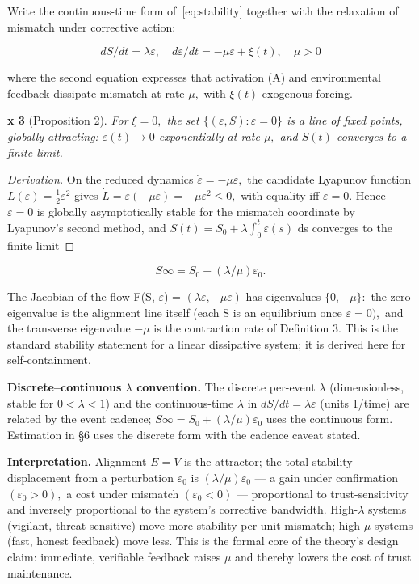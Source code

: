 \documentclass[
]{article}
\begin{document}
Write the continuous-time form of~{[}eq:stability{]} together with the
relaxation of mismatch under corrective action:

\begin{equation}
dS/dt = \lambda \varepsilon, \quad d\varepsilon/dt = -\mu \varepsilon + \xi(t), \quad \mu > 0
\label{eq:flow}
\end{equation}

where the second equation expresses that activation (A) and
environmental feedback dissipate mismatch at rate \(\mu,\) with
\(\xi(t)\) exogenous forcing.

\textbf{x 3} (Proposition 2). \emph{For \(\xi = 0,\) the set
\(\{(\varepsilon, S) : \varepsilon = 0\}\) is a line of fixed points,
globally attracting: \(\varepsilon(t) \to 0\) exponentially at rate
\(\mu,\) and \(S(t)\) converges to a finite limit.}

\emph{Derivation.} On the reduced dynamics
\(\dot{\varepsilon} = -\mu \varepsilon,\) the candidate Lyapunov
function \(L(\varepsilon) = \tfrac{1}{2} \varepsilon^{2}\) gives
\(\dot{L} = \varepsilon(-\mu \varepsilon) = -\mu \varepsilon^{2} \leq 0,\)
with equality iff \(\varepsilon = 0.\) Hence \(\varepsilon = 0\) is
globally asymptotically stable for the mismatch coordinate by Lyapunov's
second method, and \(S(t) = S_{0} + \lambda\int_{0}^{t} \varepsilon(s)\)
ds converges to the finite limit~◻

\begin{equation}
S\infty = S_{0} + (\lambda/\mu)\varepsilon_{0}.
\label{eq:slimit}
\end{equation}

The Jacobian of the flow F(S, \(\varepsilon\)) =
\((\lambda \varepsilon, -\mu \varepsilon)\) has eigenvalues
\(\{0, -\mu \}:\) the zero eigenvalue is the alignment line itself (each
S is an equilibrium once \(\varepsilon = 0),\) and the transverse
eigenvalue \(-\mu\) is the contraction rate of Definition 3. This is the
standard stability statement for a linear dissipative system; it is
derived here for self-containment.

\textbf{Discrete--continuous \(\lambda\) convention.} The discrete
per-event \(\lambda\) (dimensionless, stable for \(0 < \lambda < 1\))
and the continuous-time \(\lambda\) in \(dS/dt = \lambda\varepsilon\)
(units 1/time) are related by the event cadence;
\(S\infty = S_{0} + (\lambda/\mu)\varepsilon_{0}\) uses the continuous
form. Estimation in §6 uses the discrete form with the cadence caveat
stated.

\textbf{Interpretation.} Alignment \(E = V\) is the attractor; the total
stability displacement from a perturbation \(\varepsilon_{0}\) is
\((\lambda/\mu)\varepsilon_{0}\) --- a gain under confirmation
\((\varepsilon_{0} > 0),\) a cost under mismatch
\((\varepsilon_{0} < 0)\) --- proportional to trust-sensitivity and
inversely proportional to the system's corrective bandwidth.
High-\(\lambda\) systems (vigilant, threat-sensitive) move more
stability per unit mismatch; high-\(\mu\) systems (fast, honest
feedback) move less. This is the formal core of the theory's design
claim: immediate, verifiable feedback raises \(\mu\) and thereby lowers
the cost of trust maintenance.
\end{document}
